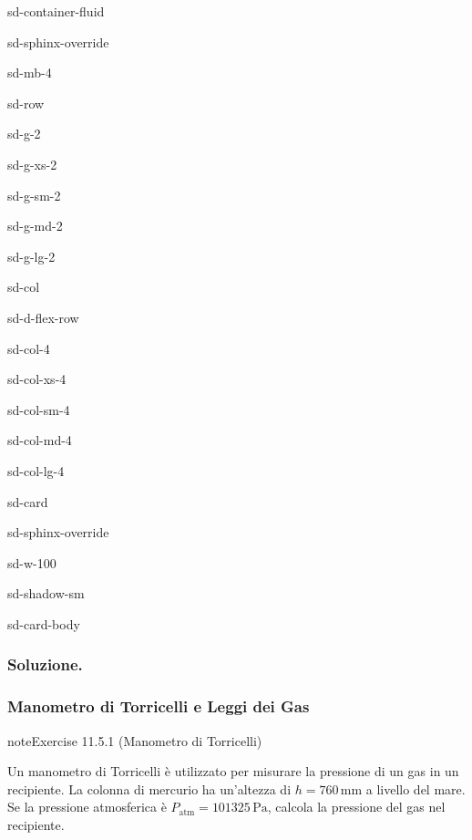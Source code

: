 \documentclass[letterpaper,10pt,italian]{jupyterBook}
\begin{document}
\begin{sphinxuseclass}{sd-container-fluid}
\begin{sphinxuseclass}{sd-sphinx-override}
\begin{sphinxuseclass}{sd-mb-4}
\begin{sphinxuseclass}{sd-row}
\begin{sphinxuseclass}{sd-g-2}
\begin{sphinxuseclass}{sd-g-xs-2}
\begin{sphinxuseclass}{sd-g-sm-2}
\begin{sphinxuseclass}{sd-g-md-2}
\begin{sphinxuseclass}{sd-g-lg-2}
\begin{sphinxuseclass}{sd-col}
\begin{sphinxuseclass}{sd-d-flex-row}
\begin{sphinxuseclass}{sd-col-4}
\begin{sphinxuseclass}{sd-col-xs-4}
\begin{sphinxuseclass}{sd-col-sm-4}
\begin{sphinxuseclass}{sd-col-md-4}
\begin{sphinxuseclass}{sd-col-lg-4}
\begin{sphinxuseclass}{sd-card}
\begin{sphinxuseclass}{sd-sphinx-override}
\begin{sphinxuseclass}{sd-w-100}
\begin{sphinxuseclass}{sd-shadow-sm}
\begin{sphinxuseclass}{sd-card-body}
\end{sphinxuseclass}
\end{sphinxuseclass}
\end{sphinxuseclass}
\end{sphinxuseclass}
\end{sphinxuseclass}
\end{sphinxuseclass}
\end{sphinxuseclass}
\end{sphinxuseclass}
\end{sphinxuseclass}
\end{sphinxuseclass}
\end{sphinxuseclass}
\end{sphinxuseclass}
\end{sphinxuseclass}
\end{sphinxuseclass}
\end{sphinxuseclass}
\end{sphinxuseclass}
\end{sphinxuseclass}
\end{sphinxuseclass}
\end{sphinxuseclass}
\end{sphinxuseclass}
\end{sphinxuseclass}\subsubsection*{Soluzione.}


\subsubsection{Manometro di Torricelli e Leggi dei Gas}
\label{\detokenize{ch/thermodynamics/foundation-problems:manometro-di-torricelli-e-leggi-dei-gas}} \label{exercise:ch/thermodynamics/foundation-problems-exercise-0}

\begin{sphinxadmonition}{note}{Exercise 11.5.1 (Manometro di Torricelli)}



\sphinxAtStartPar
Un manometro di Torricelli è utilizzato per misurare la pressione di un gas in un recipiente. La colonna di mercurio ha un’altezza di \(h = 760 \, \text{mm}\) a livello del mare. Se la pressione atmosferica è \(P_\text{atm} = 101325 \, \text{Pa}\), calcola la pressione del gas nel recipiente.
\end{sphinxadmonition}
 \label{exercise:ch/thermodynamics/foundation-problems-exercise-1}
\end{document}
